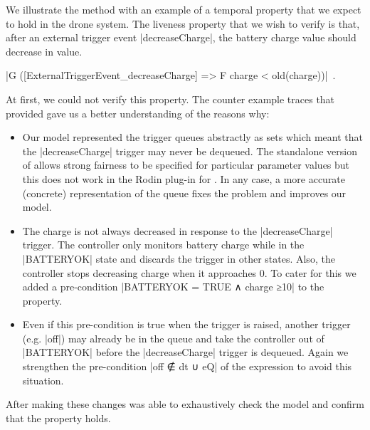 We illustrate the method with an example of a temporal property that we expect to hold in the drone \SCXML system. 
The liveness property that we wish to  verify is that, after an external trigger event |decreaseCharge|, the battery charge value should  decrease in value.
\begin{center}
  |G ([ExternalTriggerEvent_decreaseCharge] => F {charge < old(charge)})|~.
\end{center}
At first, we could not verify this property.
The counter example traces that \PROB provided gave us a better understanding of the reasons why:
\begin{itemize}
\item
Our model represented the trigger queues abstractly as sets which meant that the |decreaseCharge| trigger may never be dequeued.
The standalone version of \PROB allows strong fairness to be specified for particular parameter values but this does not work in the Rodin plug-in for \PROB. 
In any case, a more accurate (concrete) representation of the queue fixes the problem and improves our model.
\item 
The charge is not always decreased in response to the |decreaseCharge| trigger.
The controller only monitors battery charge while in the |BATTERYOK| state and discards the trigger in other states.
Also, the controller stops decreasing charge when it approaches 0. 
To cater for this we added a pre-condition |BATTERYOK = TRUE ∧ charge ≥10| to the \LTL property.
\item
Even if this pre-condition is true when the trigger is raised, another trigger (e.g. |off|) may already be in the queue and take the controller out of |BATTERYOK| before the |decreaseCharge| trigger is dequeued.
Again we strengthen the pre-condition |off ∉ dt ∪ eQ| of the \LTL expression to avoid this situation.
\end{itemize}
After making these changes \PROB was able to exhaustively check the model and confirm that the \LTL property holds.

